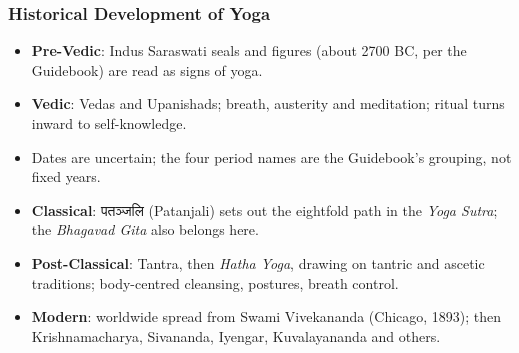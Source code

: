 \begin{frame}[fragile]
\end{frame}

\begin{frame}[fragile]\frametitle{Historical Development of Yoga}

      \begin{itemize}
		\item \textbf{Pre-Vedic}: Indus Saraswati seals and figures (about 2700 BC, per the Guidebook) are read as signs of yoga.
		\item \textbf{Vedic}: Vedas and Upanishads; breath, austerity and meditation; ritual turns inward to self-knowledge.
		\item Dates are uncertain; the four period names are the Guidebook's grouping, not fixed years.
		\item \textbf{Classical}: पतञ्जलि (Patanjali) sets out the eightfold path in the \textit{Yoga Sutra}; the \textit{Bhagavad Gita} also belongs here.
		\item \textbf{Post-Classical}: Tantra, then \textit{Hatha Yoga}, drawing on tantric and ascetic traditions; body-centred cleansing, postures, breath control.
		\item \textbf{Modern}: worldwide spread from Swami Vivekananda (Chicago, 1893); then Krishnamacharya, Sivananda, Iyengar, Kuvalayananda and others.

		
	  \end{itemize}

\end{frame}

